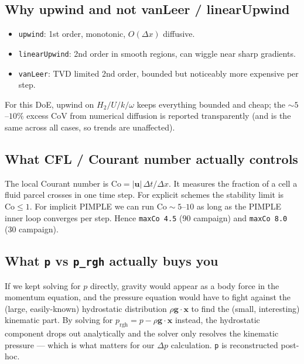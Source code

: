\documentclass[11pt,a4paper]{article}
\begin{document}
\subsection{Why upwind and not vanLeer / linearUpwind}

\begin{itemize}[leftmargin=1.5em,topsep=2pt]
    \item \texttt{upwind}: 1st order, monotonic, $O(\Delta x)$
    diffusive.
    \item \texttt{linearUpwind}: 2nd order in smooth regions, can wiggle near
    sharp gradients.
    \item \texttt{vanLeer}: TVD limited 2nd order, bounded but
    noticeably more expensive per step.
\end{itemize}
For this DoE, upwind on $H_2/U/k/\omega$ keeps everything bounded and
cheap; the $\sim 5$--$10\%$ excess CoV from numerical diffusion is
reported transparently (and is the same across all cases, so trends
are unaffected).

\subsection{What CFL / Courant number actually controls}

The local Courant number is
\(\mathrm{Co} = |\mathbf{u}|\,\Delta t / \Delta x\). It measures the
fraction of a cell a fluid parcel crosses in one time step. For
explicit schemes the stability limit is $\mathrm{Co}\le 1$.
For implicit PIMPLE we can run $\mathrm{Co}\sim 5$--$10$ as long as the
PIMPLE inner loop converges per step. Hence
\texttt{maxCo 4.5} (90\textdegree{} campaign) and \texttt{maxCo 8.0}
(30\textdegree{} campaign).

\subsection{What \texttt{p} vs \texttt{p\_rgh} actually buys you}

If we kept solving for $p$ directly, gravity would appear as a body
force in the momentum equation, and the pressure equation would have
to fight against the (large, easily-known) hydrostatic distribution
$\rho \mathbf{g}\!\cdot\!\mathbf{x}$ to find the (small, interesting)
kinematic part. By solving for $p_\mathrm{rgh}=p-\rho\mathbf{g}\!\cdot\!\mathbf{x}$
instead, the hydrostatic component drops out analytically and the
solver only resolves the kinematic pressure --- which is what
matters for our $\Delta p$ calculation. \texttt{p} is reconstructed
post-hoc.
\end{document}
